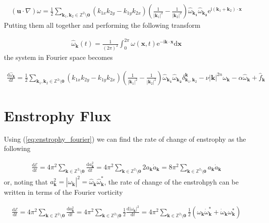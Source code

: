 \documentclass[9pt]{article}
\newcommand{\der}[2]{\frac{\mathrm{d}#1}{\mathrm{d}#2}}          	 %
\newcommand{\ii}{\mathrm{i}}      								  %
\newcommand{\e}{\mathrm{e}}      								  %
\newcommand{\bfu}{\mathbf{u}}											%
\newcommand{\omegahat}[1]{\hat{\omega}_{ \mathbf{#1} } }								%
\newcommand{\bfx}{\mathbf{x}}								%
\newcommand{\bfk}{\mathbf{k}}								%
\newcommand{\bfkn}[1]{\mathbf{k}_{#1}}								%
\begin{document}
\begin{align}
	\left(\bfu \cdot \nabla\right) \omega = \frac{1}{2} \sum_{\mathbf{k}_1, \mathbf{k}_2\in \mathbb{Z}^2\setminus \mathbf{0}}\left(k_{1x}k_{2y} - k_{1y}k_{2x}\right) \left(\frac{1}{|\bfkn{1}|^2} - \frac{1}{|\bfkn{2}|^2}\right) \omegahat{\bfkn{1}}\omegahat{\bfkn{2}} \e^{\ii (\bfkn{1} + \bfkn{2}) \cdot \bfx}
\end{align}
Putting them all together and performing the following transform

\begin{align}
	\omegahat{\bfk} (t)= \frac{1}{(2\pi)^2}\int_0^{2\pi}\omega(\bfx, t)\e^{-\ii \bfk \cdot \bfx}\mathrm{d}\mathbf{x}
\end{align}
the system in Fourier space becomes

\begin{align}
	\der{\omegahat{k}}{t} = \frac{1}{2}	\sum_{\mathbf{k}_1, \mathbf{k}_2\in \mathbb{Z}^2\setminus \mathbf{0}}\left(k_{1x}k_{2y} - k_{1y}k_{2x}\right) \left(\frac{1}{|\bfkn{1}|^2} - \frac{1}{|\bfkn{2}|^2}\right) \omegahat{\bfkn{1}}\omegahat{\bfkn{2}} \delta_{\bfkn{1}, \bfkn{2}}^{\bfk} - \nu |\bfk|^{2n}\omegahat{k} - \alpha\omegahat{k} + \hat{f}_{\bfk}
	\label{eq:vort_eqn_fourier_space}
\end{align}

\section{Enstrophy Flux}

Using (\ref{eq:enstrophy_fourier}) we can find the rate of change of enstrophy as the following

\begin{align}
\der{\mathcal{E}}{t} = 4\pi^2 \sum_{\mathbf{k}\in \mathbb{Z}^2\setminus \mathbf{0}} \der{a_{\bfk}^2}{t}  = 4\pi^2 \sum_{\mathbf{k}\in \mathbb{Z}^2\setminus \mathbf{0}} 2 a_{\bfk} \dot{a}_{\bfk} = 8\pi^2 \sum_{\mathbf{k}\in \mathbb{Z}^2\setminus \mathbf{0}} a_{\bfk} \dot{a}_{\bfk}
\end{align}
or, noting that $a_{\bfk}^2 = |\hat{\omega}_{\bfk}|^2 = \hat{\omega}_{\bfk}\hat{\omega}_{\bfk}^{*}$, the rate of change of the enstrohpyh can be written in terms of the Fourier vorticity


\begin{align}
	\der{\mathcal{E}}{t} = 4\pi^2 \sum_{\mathbf{k}\in \mathbb{Z}^2\setminus \mathbf{0}} \der{a_{\bfk}^2}{t} = 4\pi^2 \sum_{\mathbf{k}\in \mathbb{Z}^2\setminus \mathbf{0}} \frac{1}{2}\der{|\omega_{\bfk}|^2}{t} = 4\pi^2 \sum_{\mathbf{k}\in \mathbb{Z}^2\setminus \mathbf{0}} \frac{1}{2}(\omega_{\bfk} \dot{\omega}^{*}_{\bfk} + \dot{\omega}_{\bfk} \omega^{*}_{\bfk})
\end{align}
\end{document}
